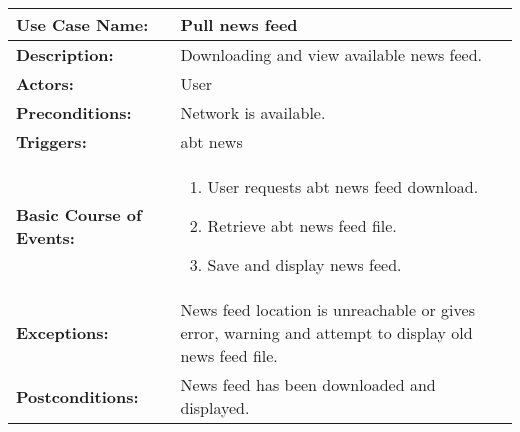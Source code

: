 
\begin{tabularx}{\linewidth}{|l|X|}
\hline
\textbf{Use Case Name:} & \textbf{Pull news feed} \\
\hline
\textbf{Description:} & 
Downloading and view available news feed. \\
\hline
\textbf{Actors:} & User \\
\hline
\textbf{Preconditions:} & 
Network is available. \\
\hline
\textbf{Triggers:} & abt news  \\
\hline
\textbf{Basic Course of Events:} & 
\begin{minipage}{\linewidth} 
  \vspace{0.05em}
  \begin{enumerate}
    \item User requests abt news feed download.
    \item Retrieve abt news feed file.
    \item Save and display news feed.
  \end{enumerate}
  \vspace{0.05em}
\end{minipage}
\\
\hline
\textbf{Exceptions:} & 
News feed location is unreachable or gives error, warning and attempt to display old news feed file. \\
\hline 
\textbf{Postconditions:} &
News feed has been downloaded and displayed.
\\
\hline
\end{tabularx}


